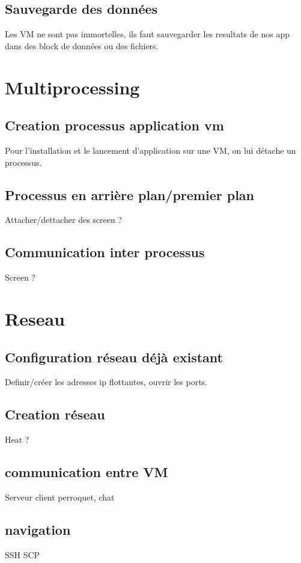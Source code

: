 \documentclass{report}
\begin{document}
        \subsection{Sauvegarde des données}
            Les VM ne sont pas immortelles, ils faut sauvegarder les resultats de nos app dans des block de données ou des fichiers.
            
    \section{Multiprocessing}
        \subsection{Creation processus application vm}
            Pour l'installation et le lancement d'application sur une VM, on lui détache un processus.
        \subsection{Processus en arrière plan/premier plan}
            Attacher/dettacher des screen ?
        \subsection{Communication inter processus}
            Screen ?
            
    \section{Reseau}
        \subsection{Configuration réseau déjà existant}
            Definir/créer les adresses ip flottantes, ouvrir les ports.
        \subsection{Creation réseau}
            Heat ?
        \subsection{communication entre VM}
            Serveur client perroquet, chat
        \subsection{navigation}
            SSH SCP
            
\end{document}
